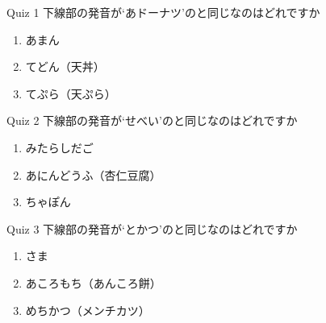 \documentclass[aspectratio=169,xcolor={dvipsnames,table}]{beamer}
\begin{document}
\begin{frame}[plain]{Quiz 1}
下線部の発音が`あドーナツ'のと同じなのはどれですか%
\hfill{}

\begin{enumerate}
 \item あまん\hfill{}
 \item てどん（天丼）\hfill{}
 \item てぷら（天ぷら）\hfill{}

\end{enumerate}
\end{frame}

\begin{frame}[plain]{Quiz 2}
下線部の発音が`せべい'のと同じなのはどれですか%
\hfill{}

\begin{enumerate}
 \item みたらしだご\hfill{}
 \item あにんどうふ（杏仁豆腐）\hfill{}
 \item ちゃぽん\hfill{}
\end{enumerate}
\end{frame}
\begin{frame}[plain]{Quiz 3}
下線部の発音が`とかつ'のと同じなのはどれですか\hfill{}

\begin{enumerate}
 \item さま\hfill{}
 \item あころもち（あんころ餅）\hfill{}
 \item めちかつ（メンチカツ）\hfill{}

\end{enumerate}
\end{frame}
\end{document}
